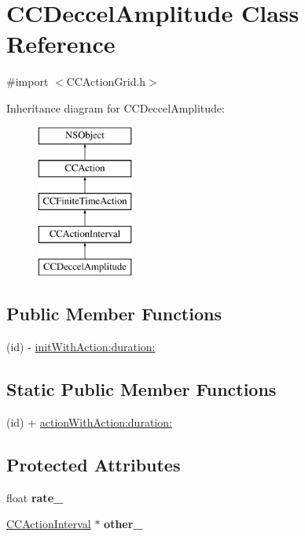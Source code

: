 \hypertarget{interface_c_c_deccel_amplitude}{\section{C\-C\-Deccel\-Amplitude Class Reference}
\label{interface_c_c_deccel_amplitude}
}


{\ttfamily \#import $<$C\-C\-Action\-Grid.\-h$>$}

Inheritance diagram for C\-C\-Deccel\-Amplitude\-:\begin{figure}[H]
\begin{center}
\leavevmode
\includegraphics[height=5.000000cm]{interface_c_c_deccel_amplitude}
\end{center}
\end{figure}
\subsection*{Public Member Functions}
\begin{DoxyCompactItemize}
\item 
(id) -\/ \hyperlink{interface_c_c_deccel_amplitude_a45919a8400869994260dac940cc9fec4}{init\-With\-Action\-:duration\-:}
\end{DoxyCompactItemize}
\subsection*{Static Public Member Functions}
\begin{DoxyCompactItemize}
\item 
(id) + \hyperlink{interface_c_c_deccel_amplitude_ae877f5b01e6e902eb76047f8feaeae94}{action\-With\-Action\-:duration\-:}
\end{DoxyCompactItemize}
\subsection*{Protected Attributes}
\begin{DoxyCompactItemize}
\item 
\hypertarget{interface_c_c_deccel_amplitude_af40a17b010e3660dbb4725f55ab32bc2}{float {\bfseries rate\-\_\-}}\label{interface_c_c_deccel_amplitude_af40a17b010e3660dbb4725f55ab32bc2}

\item 
\hypertarget{interface_c_c_deccel_amplitude_a302e45f0ac5c78676ca626178e756621}{\hyperlink{class_c_c_action_interval}{C\-C\-Action\-Interval} $\ast$ {\bfseries other\-\_\-}}\label{interface_c_c_deccel_amplitude_a302e45f0ac5c78676ca626178e756621}

\end{DoxyCompactItemize}

